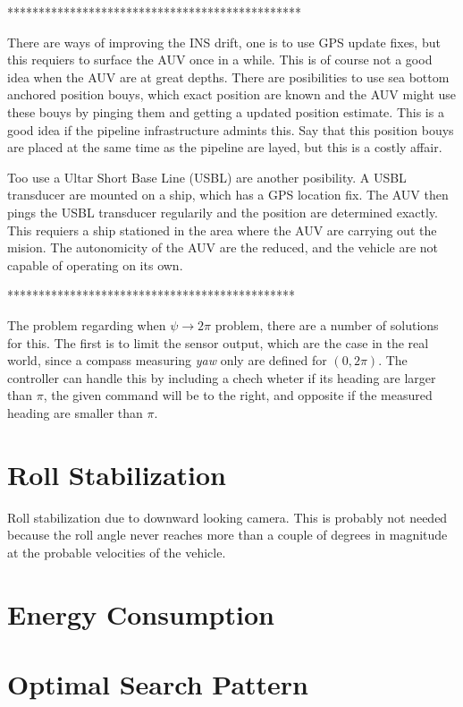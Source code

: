 	***********************************************

	There are ways of improving the INS drift, one is to use GPS update fixes, but this requiers to
	surface the AUV once in a while. This is of course not a good idea when the AUV are at great depths.
	There are posibilities to use sea bottom anchored position bouys, which exact position are known and
	the AUV might use these bouys by pinging them and getting a updated position estimate. This is a good
	idea if the pipeline infrastructure admints this. Say that this position bouys are placed at the same
	time as the pipeline are layed, but this is a costly affair. 

	Too use a Ultar Short Base Line (USBL) are another posibility. A USBL transducer are mounted on a
	ship, which has a GPS location fix. The AUV then pings the USBL transducer regularily and the position
	are determined exactly. This requiers a ship stationed in the area where the AUV are carrying out the
	mision. The autonomicity of the AUV are the reduced, and the vehicle are not capable of operating on
	its own. 

	**********************************************

	The problem regarding when $\psi \rightarrow 2\pi$ problem, there are a number of solutions for this.
	The first is to limit the sensor output, which are the case in the real world, since a compass
	measuring \textit{yaw} only are defined for $(0, 2 \pi)$. The controller can handle this by including
	a chech wheter if its heading are larger than $\pi$, the given command will be to the right, and
	opposite if the measured heading are smaller than $\pi$.






\section{Roll Stabilization}
	Roll stabilization due to downward looking camera. This is probably not needed because the roll angle
	never reaches more than a couple of degrees in magnitude at the probable velocities of the vehicle. 


\section{Energy Consumption}


\section{Optimal Search Pattern}




